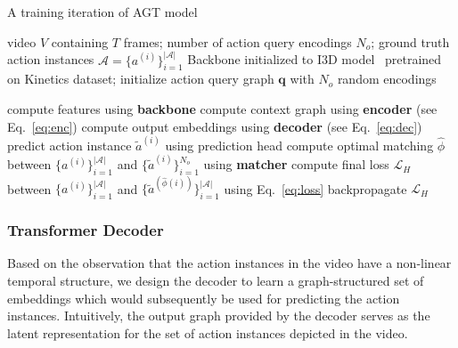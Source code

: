 \documentclass[10pt,twocolumn,letterpaper]{article}
\begin{document}
\begin{algorithm}[t]
\caption{A training iteration of AGT model}
\label{algo}
\begin{algorithmic}[1]
\renewcommand{\algorithmicensure}{\textbf{Inputs:}}
\Ensure video $V$ containing $T$ frames; number of action query encodings $N_o$; ground truth action instances $\mathcal{A} = \{a^{(i)}\}_{i=1}^{|\mathcal{A}|}$
\renewcommand{\algorithmicensure}{\textbf{Initializations:}}
\Ensure Backbone initialized to I3D model~\cite{carreira2017quo} pretrained on Kinetics dataset; initialize action query graph $\mathbf{q}$ with $N_o$ random encodings

\State compute features using \textbf{backbone}\;
\State compute context graph using \textbf{encoder} (see Eq.~\ref{eq:enc})\;
\State compute output embeddings using \textbf{decoder} (see Eq.~\ref{eq:dec})\;
    \State predict action instance $\tilde a^{(i)}$ using prediction head \;
    \EndFor
\State compute optimal matching $\hat \phi$ between $\{a^{(i)}\}_{i=1}^{|\mathcal{A}|}$ and $\{\tilde a^{(i)}\}_{i=1}^{N_o}$ using \textbf{matcher} \;
\State compute final loss $\mathcal{L}_{H}$ between $\{a^{(i)}\}_{i=1}^{|\mathcal{A}|}$ and $\{\tilde a^{(\hat\phi(i))}\}_{i=1}^{|\mathcal{A}|}$ using Eq.~\ref{eq:loss}\;
\State backpropagate $\mathcal{L}_{H}$
\end{algorithmic}
\end{algorithm} 
\subsubsection{Transformer Decoder}\label{subsec:decoder}
Based on the observation that the action instances in the video have a non-linear temporal structure, we design the decoder to learn a graph-structured set of embeddings which would subsequently be used for predicting the action instances.
Intuitively, the output graph provided by the decoder
serves as the latent representation for the set of action instances depicted in the video. 
\end{document}
